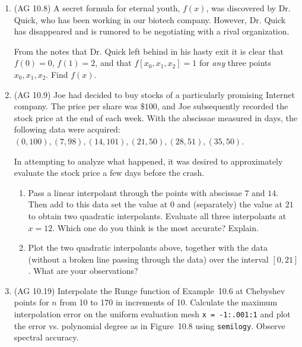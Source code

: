 \documentclass[11pt]{article}
\begin{document}
\begin{enumerate}
\item (AG 10.8)
A secret formula for eternal youth, $f(x)$, was discovered
by Dr. Quick, who has been working in our biotech company.
However, Dr. Quick has disappeared and is rumored to be
negotiating with a rival organization.

From the notes that Dr. Quick left behind
in his hasty exit it is clear that
$f(0) = 0$, $f(1) = 2$, and that $f[x_0,x_1,x_2] = 1$
for {\em any} three points
$x_0, x_1, x_2$.
Find $f(x)$.

\item (AG 10.9)
     Joe had decided to buy stocks of a particularly promising
      Internet company. The price per share was $\$100$, and Joe
      subsequently recorded the stock price at the end of each
      week. With the abscissae measured in days, the following data were
      acquired: \\
      $(0,100), (7,98), (14,101), (21,50), (28,51), (35,50)$.


      In attempting to analyze what happened, it was desired to
      approximately evaluate the stock price a few days before
      the crash.
  \begin{enumerate}
    \item Pass a linear interpolant through the points with
      abscissae $7$ and $14$. Then add to this data set the value at $0$
      and (separately) the value at $21$ to obtain two quadratic
      interpolants. Evaluate all three interpolants at $x=12$.
      Which one do you think is the most accurate? Explain.
    \item Plot the two quadratic interpolants above, together
      with the data (without a broken line passing through the data)
      over the interval $[0,21]$.
      What are your observations?
  \end{enumerate}



\item (AG 10.19) Interpolate the Runge function of Example~10.6 at Chebyshev points
for $n$ from 10 to 170 in increments of 10.
Calculate the maximum interpolation error on the uniform evaluation mesh {\tt x = -1:.001:1}
and plot the error vs. polynomial degree as in Figure~10.8 using {\tt semilogy}.
Observe spectral accuracy.



\end{enumerate}
\end{document}
